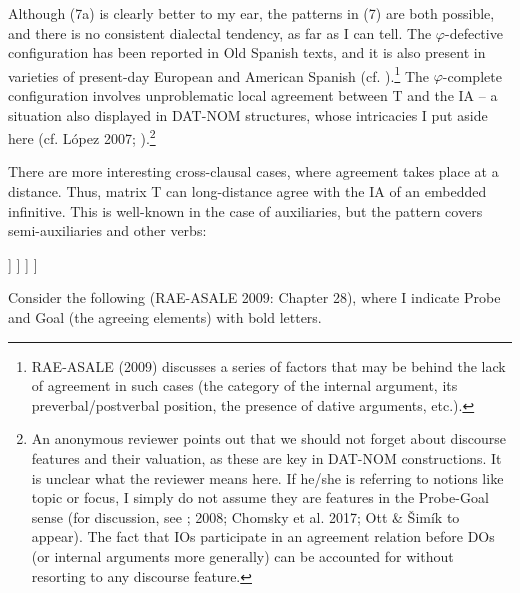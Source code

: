 \documentclass[output=paper]{langsci/langscibook}
\begin{document}
Although (7a) is clearly better to my ear, the patterns in (7) are both possible, and there is no consistent dialectal tendency, as far as I can tell. The $\varphi $-defective configuration has been reported in Old Spanish texts, and it is also present in varieties of present-day European and American Spanish (cf. \citealt{Mendikoetxea1999}).\footnote{RAE-ASALE (2009) discusses a series of factors that may be behind the lack of agreement in such cases (the category of the internal argument, its preverbal/postverbal position, the presence of dative arguments, etc.).} The $\varphi $-complete configuration involves unproblematic local agreement between T and the IA – a situation also displayed in DAT-NOM structures, whose intricacies I put aside here (cf. López 2007; \citealt{Chomsky2008}).\footnote{An anonymous reviewer points out that we should not forget about discourse features and their valuation, as these are key in DAT-NOM constructions. It is unclear what the reviewer means here. If he/she is referring to notions like topic or focus, I simply do not assume they are features in the Probe-Goal sense (for discussion, see \citealt{Chomsky2001}; 2008; Chomsky et al. 2017; Ott \& Šimík to appear). The fact that IOs participate in an agreement relation before DOs (or internal arguments more generally)  can be accounted for without resorting to any discourse feature.} 

There are more interesting cross-clausal cases, where agreement takes place at a distance. Thus, matrix T can long-distance agree with the IA of an embedded infinitive. This is well-known in the case of auxiliaries, but the pattern covers semi-auxiliaries and other verbs: 

\ea%
\settowidth\jamwidth{[SEMIAUX = try, need, etc.]}
    \label{ex:key:8}
    \ea\relax [ T [ SE  V\textsubscript{AUX}         [ INF XP ] ] ]      \jambox{[AUX = can, should, etc.]}
    \ex\relax [ T [ SE  V\textsubscript{SEMIAUX}  [ INF XP ] ] ]         \jambox{[SEMIAUX = try, need, etc.]}
    \z
\z    

  

Consider the following (RAE-ASALE 2009: Chapter 28), where I indicate Probe and Goal (the agreeing elements) with bold letters.
\end{document}
